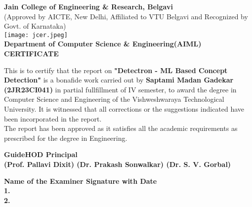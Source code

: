 \documentclass[12pt,a4paper]{article}
\begin{document}
\begin{titlepage}
\begin{center}
\textbf{{\large Jain College of Engineering \& Research, Belgavi}}\\
{\small  (Approved by AICTE, New Delhi, Affiliated to VTU Belgavi and Recognized by Govt. of Karnataka)}\\
\vspace{0.2in}
\texttt{[image: jcer.jpeg]}\\
\vspace{0.2in}
\textbf{Department of Computer Science \& Engineering(AIML)}\\
\vspace{0.5in}
\textbf{{\large CERTIFICATE}}\\
\end{center}
\vspace{0.2in}
{\small  This is to certify that the report on \textbf {"Detectron - ML Based Concept Detection"} is a bonafide work carried out by \textbf {Saptami Madan  Gadekar (2JR23CI041)} in partial fullfillment of IV semester, to award the degree in Computer Science and Engineering of the Vishweshwaraya Technological University. It is witnessed that all corrections  or the suggestions indicated have been incorporated in the report.\\
The report has been approved as it satisfies all the academic requirements as prescribed for the degree in Engineering.}\\

\vspace{1.0in}

\textbf{\hspace{0.4in}Guide\hspace{1.9in}HOD \hspace{1.8in } Principal}\\
\textbf{ (Prof. Pallavi Dixit) \hspace{0.5in}(Dr. Prakash Sonwalkar)\hspace{0.6in } (Dr. S. V. Gorbal)}\\

\vspace{0.5in}

\textbf{Name of the Examiner \hspace{2.7in} Signature with Date} \\[0.8cm]
\textbf {1.} \hspace{1cm} \hspace{15cm} \hspace{1cm} \\[0.1cm]
\textbf{2.} \hspace{1cm} \hspace{14cm} \hspace{1cm}
\end{titlepage}
\end{document}
